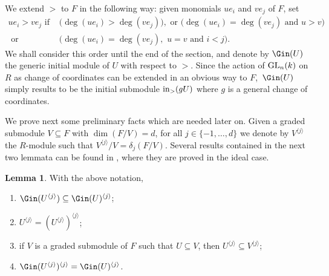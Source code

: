\documentclass[12pt]{amsart}
\theoremstyle{definition}
\newtheorem{lemma}[theorem]{Lemma}
\theoremstyle{definition}
\begin{document}
  We extend $>$ to $F$ in the following way: given monomials $ue_i$ and $ve_j$ of $F$, set
 \begin{equation*}
 \begin{split} ue_i>ve_j \text{ if }& \big(\deg(ue_i)>\deg(ve_j)\big), \text{ or } \big(\deg(ue_i)=\deg(ve_j) \text{ and } u>v\big)\\
  \text{ or }& \big(\deg(ue_i)=\deg(ve_j),\,\,u=v \text{ and } i<j\big). 
 \end{split}
\end{equation*}
We shall consider this order until the end of the section, and denote by $\Gin(U)$ the generic initial module of $U$ with respect to $>$. Since the action of ${\rm GL}_n(k)$ on  $R$ as change of coordinates can be extended in an obvious way to $F$,\, $\Gin(U)$ simply results to be the initial submodule ${\rm in}_>(gU)$ where $g$ is a general change of coordinates.
 
We prove next some preliminary facts which are needed later on. Given a graded submodule $V \subseteq F$ with $\dim(F/V)=d$, for all $j\in \{-1,\ldots,d\}$ we denote by $V^{\langle j \rangle}$ the $R$-module such that  $V^{\langle j \rangle}/V=\delta_j(F/V)$. Several results contained in the next two lemmata can be found in \cite{Go16}, where they are proved in the ideal case.

\begin{lemma}\label{Afshin}
With the above notation,
\begin{enumerate}[(1)]
\item $\Gin(U^{\langle j \rangle}) \subseteq \Gin(U)^{\langle j \rangle}$;
\item $U^{\langle j \rangle}=(U^{\langle j \rangle})^{\langle j \rangle}$;
\item if $V$ is a graded submodule of $F$ such that  $U \subseteq V$, then $U^{\langle j \rangle} \subseteq V^{\langle j \rangle}$;
\item $\Gin(U^{\langle j \rangle})^{\langle j \rangle}=\Gin(U)^{\langle j \rangle}$.
\end{enumerate}
\end{lemma}
\end{document}
